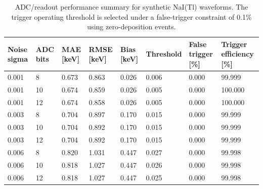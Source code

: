 \begin{table}[htbp]
\centering
\caption{ADC/readout performance summary for synthetic NaI(Tl) waveforms. The trigger operating threshold is selected under a false-trigger constraint of 0.1\% using zero-deposition events.}
\label{tab:adc_readout_summary}
\begin{tabular}{llllllll}
\hline
Noise sigma & ADC bits & MAE [keV] & RMSE [keV] & Bias [keV] & Threshold & False trigger [\%] & Trigger efficiency [\%] \\
\hline
0.001 & 8 & 0.673 & 0.863 & 0.026 & 0.006 & 0.000 & 99.999 \\
0.001 & 10 & 0.674 & 0.859 & 0.026 & 0.005 & 0.000 & 100.000 \\
0.001 & 12 & 0.674 & 0.858 & 0.026 & 0.005 & 0.000 & 100.000 \\
0.003 & 8 & 0.704 & 0.897 & 0.170 & 0.015 & 0.000 & 99.999 \\
0.003 & 10 & 0.704 & 0.892 & 0.170 & 0.015 & 0.000 & 99.999 \\
0.003 & 12 & 0.704 & 0.892 & 0.170 & 0.015 & 0.000 & 99.999 \\
0.006 & 8 & 0.820 & 1.031 & 0.447 & 0.027 & 0.000 & 99.998 \\
0.006 & 10 & 0.818 & 1.027 & 0.447 & 0.026 & 0.000 & 99.998 \\
0.006 & 12 & 0.818 & 1.027 & 0.447 & 0.025 & 0.000 & 99.998 \\
\hline
\end{tabular}
\end{table}